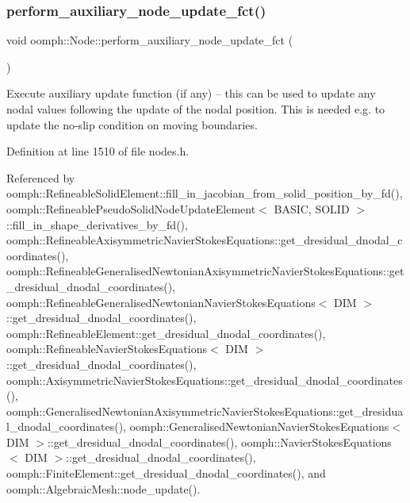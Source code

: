 \subsubsection{\texorpdfstring{perform\+\_\+auxiliary\+\_\+node\+\_\+update\+\_\+fct()}{perform\_auxiliary\_node\_update\_fct()}}
{\footnotesize\ttfamily void oomph\+::\+Node\+::perform\+\_\+auxiliary\+\_\+node\+\_\+update\+\_\+fct (\begin{DoxyParamCaption}{ }\end{DoxyParamCaption})\hspace{0.3cm}{\ttfamily [inline]}}



Execute auxiliary update function (if any) -- this can be used to update any nodal values following the update of the nodal position. This is needed e.\+g. to update the no-\/slip condition on moving boundaries. 



Definition at line 1510 of file nodes.\+h.



Referenced by oomph\+::\+Refineable\+Solid\+Element\+::fill\+\_\+in\+\_\+jacobian\+\_\+from\+\_\+solid\+\_\+position\+\_\+by\+\_\+fd(), oomph\+::\+Refineable\+Pseudo\+Solid\+Node\+Update\+Element$<$ B\+A\+S\+I\+C, S\+O\+L\+I\+D $>$\+::fill\+\_\+in\+\_\+shape\+\_\+derivatives\+\_\+by\+\_\+fd(), oomph\+::\+Refineable\+Axisymmetric\+Navier\+Stokes\+Equations\+::get\+\_\+dresidual\+\_\+dnodal\+\_\+coordinates(), oomph\+::\+Refineable\+Generalised\+Newtonian\+Axisymmetric\+Navier\+Stokes\+Equations\+::get\+\_\+dresidual\+\_\+dnodal\+\_\+coordinates(), oomph\+::\+Refineable\+Generalised\+Newtonian\+Navier\+Stokes\+Equations$<$ D\+I\+M $>$\+::get\+\_\+dresidual\+\_\+dnodal\+\_\+coordinates(), oomph\+::\+Refineable\+Element\+::get\+\_\+dresidual\+\_\+dnodal\+\_\+coordinates(), oomph\+::\+Refineable\+Navier\+Stokes\+Equations$<$ D\+I\+M $>$\+::get\+\_\+dresidual\+\_\+dnodal\+\_\+coordinates(), oomph\+::\+Axisymmetric\+Navier\+Stokes\+Equations\+::get\+\_\+dresidual\+\_\+dnodal\+\_\+coordinates(), oomph\+::\+Generalised\+Newtonian\+Axisymmetric\+Navier\+Stokes\+Equations\+::get\+\_\+dresidual\+\_\+dnodal\+\_\+coordinates(), oomph\+::\+Generalised\+Newtonian\+Navier\+Stokes\+Equations$<$ D\+I\+M $>$\+::get\+\_\+dresidual\+\_\+dnodal\+\_\+coordinates(), oomph\+::\+Navier\+Stokes\+Equations$<$ D\+I\+M $>$\+::get\+\_\+dresidual\+\_\+dnodal\+\_\+coordinates(), oomph\+::\+Finite\+Element\+::get\+\_\+dresidual\+\_\+dnodal\+\_\+coordinates(), and oomph\+::\+Algebraic\+Mesh\+::node\+\_\+update().


